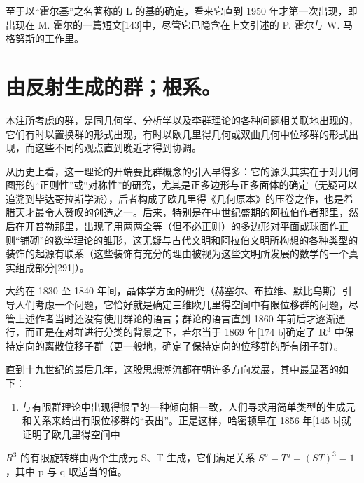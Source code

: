 至于以“霍尔基”之名著称的 L 的基的确定，看来它直到 1950 年才第一次出现，即出现在 M. 霍尔的一篇短文{[}143{]}中，尽管它已隐含在上文引述的 P. 霍尔与 W. 马格努斯的工作里。

\chapter{由反射生成的群；根系。}

本注所考虑的群，是同几何学、分析学以及李群理论的各种问题相关联地出现的，它们有时以置换群的形式出现，有时以欧几里得几何或双曲几何中位移群的形式出现，而这些不同的观点直到晚近才得到协调。

从历史上看，这一理论的开端要比群概念的引入早得多：它的源头其实在于对几何图形的“正则性”或“对称性”的研究，尤其是正多边形与正多面体的确定（无疑可以追溯到毕达哥拉斯学派），后者构成了欧几里得《几何原本》的压卷之作，也是希腊天才最令人赞叹的创造之一。后来，特别是在中世纪盛期的阿拉伯作者那里，然后在开普勒那里，出现了用两两全等（但不必正则）的多边形对平面或球面作正则“铺砌”的数学理论的雏形，这无疑与古代文明和阿拉伯文明所构想的各种类型的装饰的起源有联系（这些装饰有充分的理由被视为这些文明所发展的数学的一个真实组成部分{[}291{]}）。

大约在 1830 至 1840 年间，晶体学方面的研究（赫塞尔、布拉维、默比乌斯）引导人们考虑一个问题，它恰好就是确定三维欧几里得空间中有限位移群的问题，尽管上述作者当时还没有使用群论的语言；群论的语言直到 1860 年前后才逐渐通行，而正是在对群进行分类的背景之下，若尔当于 1869 年{[}174 b{]}确定了 \(\mathbf{R}^3\) 中保持定向的离散位移子群（更一般地，确定了保持定向的位移群的所有闭子群）。

直到十九世纪的最后几年，这股思想潮流都在朝许多方向发展，其中最显著的如下：

\begin{enumerate}
\def\labelenumi{\arabic{enumi}.}
\tightlist
\item
  与有限群理论中出现得很早的一种倾向相一致，人们寻求用简单类型的生成元和关系来给出有限位移群的“表出”。正是这样，哈密顿早在 1856 年{[}145 b{]}就证明了欧几里得空间中
\end{enumerate}

\(R^{3}\) 的有限旋转群由两个生成元 S、T 生成，它们满足关系 \(S^{p} = T^{q} = (ST)^{3} = 1\)，其中 p 与 q 取适当的值。

